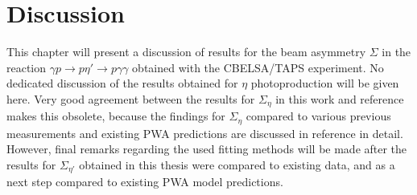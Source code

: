 \chapter{Discussion}
This chapter will present a discussion of results for the beam asymmetry $\Sigma$ in the reaction $\gamma p \to p\eta'\to p\gamma\gamma$ obtained with the CBELSA/TAPS experiment. No dedicated discussion of the results obtained for $\eta$ photoproduction will be given here. Very good agreement between the results for $\Sigma_\eta$ in this work and reference \cite{farahphd} makes this obsolete, because the findings for $\Sigma_\eta$ compared to various previous measurements and existing PWA predictions are discussed in reference \cite{farahphd} in detail. However, final remarks regarding the used fitting methods will be made after the results for $\Sigma_{\eta'}$ obtained in this thesis were compared to existing data, and as a next step compared to existing PWA model predictions. 
